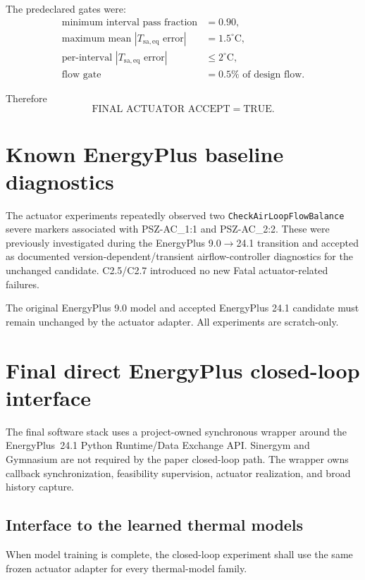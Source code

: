 \documentclass[11pt]{article}
\begin{document}
The predeclared gates were:
\begin{align}
\text{minimum interval pass fraction} & = 0.90,\\
\text{maximum mean }|T_{\mathrm{sa,eq}}\text{ error}| & = 1.5^\circ\mathrm C,\\
\text{per-interval }|T_{\mathrm{sa,eq}}\text{ error}| & \le 2^\circ\mathrm C,\\
\text{flow gate} & = 0.5\%\text{ of design flow}.
\end{align}

Therefore
\begin{equation}
\boxed{\text{FINAL ACTUATOR ACCEPT}=\mathrm{TRUE}.}
\end{equation}

\section{Known EnergyPlus baseline diagnostics}

The actuator experiments repeatedly observed two
\texttt{CheckAirLoopFlowBalance} severe markers associated with
PSZ-AC\_1:1 and PSZ-AC\_2:2.  These were previously investigated during the
EnergyPlus 9.0$\rightarrow$24.1 transition and accepted as documented
version-dependent/transient airflow-controller diagnostics for the unchanged
candidate.  C2.5/C2.7 introduced no new Fatal actuator-related failures.

The original EnergyPlus 9.0 model and accepted EnergyPlus 24.1 candidate must
remain unchanged by the actuator adapter.  All experiments are scratch-only.

\section{Final direct EnergyPlus closed-loop interface}

The final software stack uses a project-owned synchronous wrapper around the
EnergyPlus~24.1 Python Runtime/Data Exchange API.  Sinergym and Gymnasium are
not required by the paper closed-loop path.  The wrapper owns callback
synchronization, feasibility supervision, actuator realization, and broad
history capture.

\subsection*{Interface to the learned thermal models}

When model training is complete, the closed-loop experiment shall use the same
frozen actuator adapter for every thermal-model family.
\end{document}
